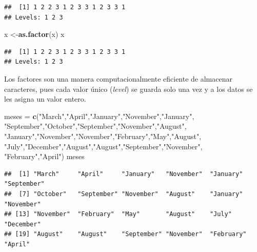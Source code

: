 \documentclass[
]{book}
\newenvironment{Shaded}{\begin{snugshade}}{\end{snugshade}}
\newcommand{\FunctionTok}[1]{\textcolor[rgb]{0.13,0.29,0.53}{\textbf{#1}}}
\newcommand{\NormalTok}[1]{#1}
\newcommand{\OtherTok}[1]{\textcolor[rgb]{0.56,0.35,0.01}{#1}}
\newcommand{\StringTok}[1]{\textcolor[rgb]{0.31,0.60,0.02}{#1}}
\begin{document}
\begin{verbatim}
##  [1] 1 2 2 3 1 2 3 3 1 2 3 3 1
## Levels: 1 2 3
\end{verbatim}

\begin{Shaded}
\begin{Highlighting}[]
\NormalTok{x }\OtherTok{\textless{}{-}}\FunctionTok{as.factor}\NormalTok{(x)}
\NormalTok{x}
\end{Highlighting}
\end{Shaded}

\begin{verbatim}
##  [1] 1 2 2 3 1 2 3 3 1 2 3 3 1
## Levels: 1 2 3
\end{verbatim}

Los factores son una manera computacionalmente eficiente de almacenar caracteres, pues cada valor único (\emph{level}) se guarda solo una vez y a los datos se les asigna un valor entero.

\begin{Shaded}
\begin{Highlighting}[]
\NormalTok{meses }\OtherTok{=} \FunctionTok{c}\NormalTok{(}\StringTok{"March"}\NormalTok{,}\StringTok{"April"}\NormalTok{,}\StringTok{"January"}\NormalTok{,}\StringTok{"November"}\NormalTok{,}\StringTok{"January"}\NormalTok{,}
       \StringTok{"September"}\NormalTok{,}\StringTok{"October"}\NormalTok{,}\StringTok{"September"}\NormalTok{,}\StringTok{"November"}\NormalTok{,}\StringTok{"August"}\NormalTok{,}
        \StringTok{"January"}\NormalTok{,}\StringTok{"November"}\NormalTok{,}\StringTok{"November"}\NormalTok{,}\StringTok{"February"}\NormalTok{,}\StringTok{"May"}\NormalTok{,}\StringTok{"August"}\NormalTok{,}
        \StringTok{"July"}\NormalTok{,}\StringTok{"December"}\NormalTok{,}\StringTok{"August"}\NormalTok{,}\StringTok{"August"}\NormalTok{,}\StringTok{"September"}\NormalTok{,}\StringTok{"November"}\NormalTok{,}
         \StringTok{"February"}\NormalTok{,}\StringTok{"April"}\NormalTok{)}
\NormalTok{meses}
\end{Highlighting}
\end{Shaded}

\begin{verbatim}
##  [1] "March"     "April"     "January"   "November"  "January"   "September"
##  [7] "October"   "September" "November"  "August"    "January"   "November" 
## [13] "November"  "February"  "May"       "August"    "July"      "December" 
## [19] "August"    "August"    "September" "November"  "February"  "April"
\end{verbatim}
\end{document}
